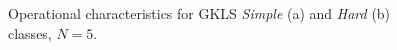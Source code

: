\documentclass[runningheads]{llncs}
\begin{document}
\begin{figure}
\begin{minipage}{0.5\linewidth}
\end{minipage}
\hfill
\begin{minipage}{0.5\linewidth}
\end{minipage}
\caption{Operational characteristics for GKLS \textit{Simple} (a) and \textit{Hard} (b) classes, $N=5$.}
\label{oper5}
\end{figure}
\end{document}
